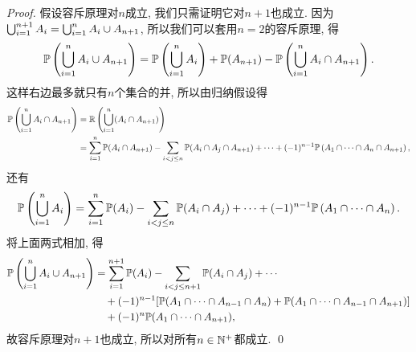 \begin{proof}
    假设容斥原理对$n$成立, 我们只需证明它对$n+1$也成立. 
    因为$\bigcup_{i=1}^{n+1}A_i = \bigcup_{i=1}^{n}A_i \cup A_{n+1}$, 所以我们可以套用$n=2$的容斥原理, 得
    $$\mathbb{P}\left(\bigcup_{i=1}^{n}A_i \cup A_{n+1}\right)
    = \mathbb{P}\left(\bigcup_{i=1}^{n}A_i\right) + \mathbb{P}(A_{n+1}) - \mathbb{P}\left(\bigcup_{i=1}^{n}A_i \cap A_{n+1}\right). $$
    这样右边最多就只有$n$个集合的并, 所以由归纳假设得
    \begin{align*}
    \mathbb{P}\left(\bigcup_{i=1}^{n}A_i \cap A_{n+1}\right)
    &= \mathbb{R}\left(\bigcup_{i=1}^{n} (A_i \cap A_{n+1})\right) \\
    &= \sum_{i=1}^{n}\mathbb{P}(A_i \cap A_{n+1}) - \sum_{i<j \leq n}\mathbb{P}(A_i \cap A_j \cap A_{n+1}) 
    + \cdots + 
    (-1)^{n-1}\mathbb{P}\left(A_1 \cap \cdots \cap A_n \cap A_{n+1}\right),
    \end{align*}
    还有
    \begin{align*}
    \mathbb{P}\left(\bigcup_{i=1}^{n}A_i\right)
    = \sum_{i=1}^{n}\mathbb{P}(A_i) - \sum_{i<j \leq n}\mathbb{P}(A_i \cap A_j) 
    + \cdots + (-1)^{n-1}\mathbb{P}\left(A_1 \cap \cdots \cap A_n\right).
    \end{align*}
    将上面两式相加, 得
    \begin{align*}
    \mathbb{P}\left(\bigcup_{i=1}^{n}A_i \cup A_{n+1}\right)
    &= \sum_{i=1}^{n+1}\mathbb{P}(A_i) - \sum_{i<j\leq n+1}\mathbb{P}(A_i \cap A_j)
    + \cdots \\
    &\quad + (-1)^{n-1}[\mathbb{P}(A_1 \cap \cdots \cap A_{n-1} \cap A_n) + 
                        \mathbb{P}(A_1 \cap \cdots \cap A_{n-1} \cap A_{n+1})] \\
    &\quad + (-1)^n \mathbb{P}(A_1 \cap \cdots \cap A_{n+1}),
    \end{align*}
    故容斥原理对$n+1$也成立, 所以对所有$n \in \mathbb{N}^+$都成立. \qed 
\end{proof}

